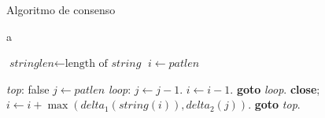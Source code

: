 \begin{algorithm}
\caption{Algoritmo de consenso}\label{euclid}
\begin{algorithmic}[1]
\State a

\State $\textit{stringlen} \gets \text{length of }\textit{string}$
\State $i \gets \textit{patlen}$

\BState \emph{top}:
 \Return false
\EndIf
\State $j \gets \textit{patlen}$
\BState \emph{loop}:
\State $j \gets j-1$.
\State $i \gets i-1$.
\State \textbf{goto} \emph{loop}.
\State \textbf{close};
\EndIf
\State $i \gets i+\max(\textit{delta}_1(\textit{string}(i)),\textit{delta}_2(j))$.
\State \textbf{goto} \emph{top}.
\EndProcedure
\end{algorithmic}
\end{algorithm}